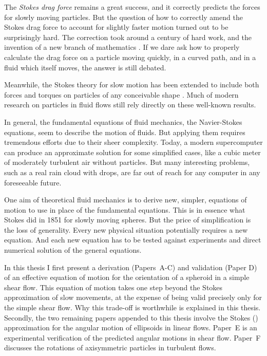 \documentclass[thesis.tex]{subfiles}
\begin{document}
The \emph{Stokes drag force} remains a great success, and it correctly predicts the forces for slowly moving particles. But the question of how to correctly amend the Stokes drag force to account for slightly faster motion turned out to be surprisingly hard. The correction took around a century of hard work, and the invention of a new branch of mathematics \cite{veysey2007}. If we dare ask how to properly calculate the drag force on a particle moving quickly, in a curved path, and in a fluid which itself moves, the answer is still debated.

Meanwhile, the Stokes theory for slow motion has been extended to include both forces and torques on particles of any conceivable shape \cite{jeffery1922,brenner1974,kim1991}. Much of modern research on particles in fluid flows still rely directly on these well-known results.

In general, the fundamental equations of fluid mechanics, the Navier-Stokes equations, seem to describe the motion of fluids. But applying them requires tremendous efforts due to their sheer complexity. Today, a modern supercomputer can produce an approximate solution for some simplified cases, like a cubic meter of moderately turbulent air without particles. But many interesting problems, such as a real rain cloud with drops, are far out of reach for any computer in any foreseeable future.

One aim of theoretical fluid mechanics is to derive new, simpler, equations of motion to use in place of the fundamental equations. This is in essence what Stokes did in 1851 for slowly moving spheres. But the price of simplification is the loss of generality. Every new physical situation potentially requires a new equation. And each new equation has to be tested against experiments and direct numerical solution of the general equations.

In this thesis I first present a derivation (Papers~A-C) and validation (Paper D) of an effective equation of motion for the orientation of a spheroid in a simple shear flow. This equation of motion takes one step beyond the Stokes approximation of slow movements, at the expense of being valid precisely only for the simple shear flow. Why this trade-off is worthwhile is explained in this thesis.
Secondly, the two remaining papers appended to this thesis involve the Stokes (\citet{jeffery1922}) approximation for the angular motion of ellipsoids in linear flows. Paper~E is an experimental verification of the predicted angular motions in shear flow. Paper~F discusses the rotations of axisymmetric particles in turbulent flows.
\end{document}
